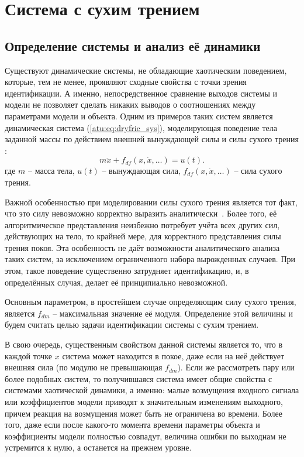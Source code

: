 
\FloatBarrier
\section{Система с сухим трением} %
\label{atu:sect:fric}


\subsection{Определение системы и анализ её динамики} %


Существуют динамические системы, не обладающие хаотическим поведением,
которые, тем не менее, проявляют сходные свойства с точки зрения идентификации.
А именно, непосредственное сравнение выходов системы и модели не позволяет
сделать никаких выводов о соотношениях между параметрами модели и объекта.
Одним из примеров таких систем является динамическая система (\ref{atu:eq:dryfric_sys}),
моделирующая поведение тела заданной массы по действием внешней вынуждающей силы
и силы сухого трения
\cite{berger_friction,osn_dyn_prom_robot,borcov}:
%
\begin{equation}
  m \ddot{x} + f_{df}( x, \dot{x}, \ldots)  = u(t).
\label{atu:eq:dryfric_sys}
\end{equation}
%
где
$m$ -- масса тела,
$u(t)$ -- вынуждающая сила,
$ f_{df}( x, \dot{x}, \ldots)  $ -- сила сухого трения.

Важной особенностью при моделировании силы сухого трения является тот факт,
что это силу невозможно корректно выразить аналитически~\cite{atu_asau11}. Более того,
её алгоритмическое представления неизбежно потребует учёта всех других сил,
действующих на тело, то крайней мере, для корректного представления
силы трения покоя. Эта особенность не даёт возможности
аналитического анализа таких систем, за исключением ограниченного набора
вырожденных случаев. При этом, такое поведение существенно затрудняет идентификацию,
и, в определённых случая, делает её принципиально невозможной.

Основным параметром, в простейшем случае определяющим силу сухого
трения, является $f_{dm}$ -- максимальная значение её модуля.
Определение этой величины и будем считать целью задачи идентификации
системы с сухим трением.

В свою очередь, существенным свойством данной системы является то, что в каждой точке \(x\)
система может находится в покое, даже если на неё действует
внешняя сила (по модулю не превышающая $f_{dm}$).
Если же рассмотреть пару или более подобных систем,
то получившаяся система имеет общие свойства с системами
хаотической динамики, а именно: малые возмущения входного сигнала
или коэффициентов модели приводят к значительным изменениям
выходного, причем реакция на возмущения может быть
не ограничена во времени.
Более того, даже если после какого-то момента времени
параметры объекта и коэффициенты модели полностью совпадут,
величина ошибки по выходнам не устремится к нулю, а останется на прежнем уровне.


